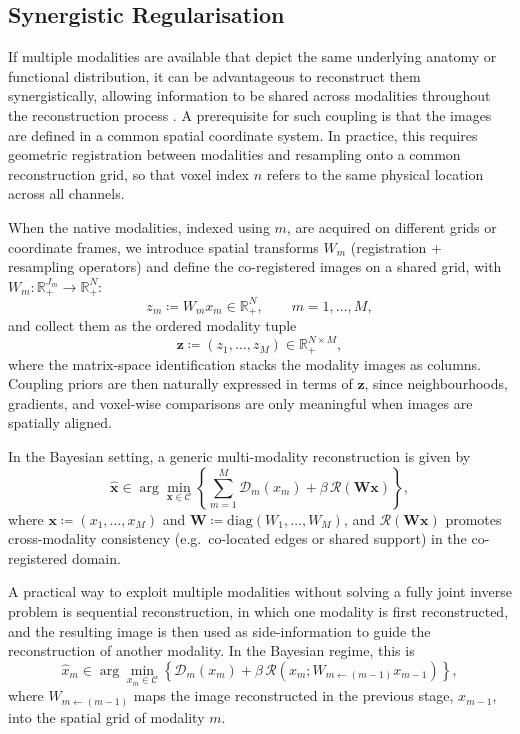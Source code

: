 \subsection{Synergistic Regularisation}\label{subsec:synergistic_recon}

If multiple modalities are available that depict the same underlying anatomy or functional distribution, it can be advantageous to reconstruct them synergistically, allowing information to be shared across modalities throughout the reconstruction process \cite{arridgeOverviewSynergisticReconstruction2021}. A prerequisite for such coupling is that the images are defined in a common spatial coordinate system. In practice, this requires geometric registration between modalities and resampling onto a common reconstruction grid, so that voxel index $n$ refers to the same physical location across all channels.

When the native modalities, indexed using $m$, are acquired on different grids or coordinate frames, we introduce spatial transforms $W_m$ (registration + resampling operators) and define the co-registered images on a shared grid, with $W_m: \mathbb{R}_+^{J_m} \rightarrow \mathbb{R}_+^N$:
\begin{equation}
    z_m \coloneqq W_m x_m \in \mathbb{R}_+^{N}, \qquad m=1,\dots,M,
\end{equation}
and collect them as the ordered modality tuple
\begin{equation}
    \bm{z} \coloneqq (z_1,\dots,z_M)
    \in  \mathbb{R}_+^{N\times M},
\end{equation}
where the matrix-space identification stacks the modality images as columns.
Coupling priors are then naturally expressed in terms of $\bm{z}$, since neighbourhoods, gradients, and voxel-wise comparisons are only meaningful when images are spatially aligned.

In the Bayesian  setting, a generic multi-modality reconstruction is given by
\begin{equation}
    \hat{\bm{x}} \in \arg\min_{\bm{x}\in\mathcal{C}}
    \left\{
        \sum_{m=1}^M \mathcal{D}_m(x_m)
        + \beta\,\mathcal{R}(\bm{Wx})
    \right\},
\end{equation}
where $\bm{x}\coloneqq(x_1,\dots,x_M)$ and $\bm{W}\coloneqq\mathrm{diag}(W_1,\dots,W_M)$, and $\mathcal{R}(\bm{Wx})$ promotes cross-modality consistency (e.g.\ co-located edges or shared support) in the co-registered domain.

A practical way to exploit multiple modalities without solving a fully joint inverse problem is sequential reconstruction, in which one modality is first reconstructed, and the resulting image is then used as side-information to guide the reconstruction of another modality. In the Bayesian regime, this is
\begin{equation}
        \hat{x}_m \in \arg\min_{x_m\in\mathcal{C}}
\left\{\mathcal{D}_m(x_m) + \beta\,\mathcal{R}(x_m;W_{m\leftarrow(m-1)}x_{m-1})\right\},
\end{equation}
where $W_{m\leftarrow(m-1)}$ maps the image reconstructed in the previous stage, $x_{m-1}$, into the spatial grid of modality $m$.


